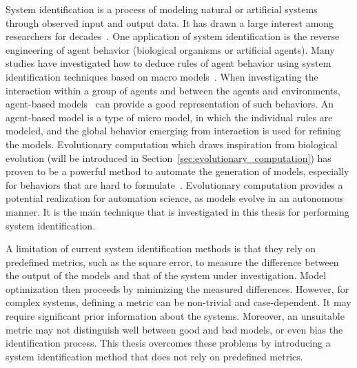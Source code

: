 System identification is a process of modeling natural or artificial systems through observed input and output data. It has drawn a large interest among researchers for decades~\cite{Ljung2010, Billings2013}. One application of system identification is the reverse engineering of agent behavior (biological organisms or artificial agents). Many studies have investigated how to deduce rules of agent behavior using system identification techniques based on macro models~\cite{Shandelle2010}. When investigating the interaction within a group of agents and between the agents and environments, agent-based models~\cite{Bonabeau2002} can provide a good representation of such behaviors. An agent-based model is a type of micro model, in which the individual rules are modeled, and the global behavior emerging from interaction is used for refining the models.  Evolutionary computation which draws inspiration from biological evolution (will be introduced in Section~\ref{sec:evolutionary_computation}) has proven to be a powerful method to automate the generation of models, especially for behaviors that are hard to formulate~\cite{Bongard2005_tevc,Bongard2007PNAS, Ruxton2008}. Evolutionary computation provides a potential realization for automation science, as models evolve in an autonomous manner. It is the main technique that is investigated in this thesis for performing system identification.

A limitation of current system identification methods is that they rely on predefined metrics, such as the square error, to measure the difference between the output of the models and that of the system under investigation. Model optimization then proceeds by minimizing the measured differences. However, for complex systems, defining a metric can be non-trivial and case-dependent. It may require significant prior information about the systems. Moreover, an unsuitable metric may not distinguish well between good and bad models, or even bias the identification process. This thesis overcomes these problems by introducing a system identification method that does not rely on predefined metrics.


